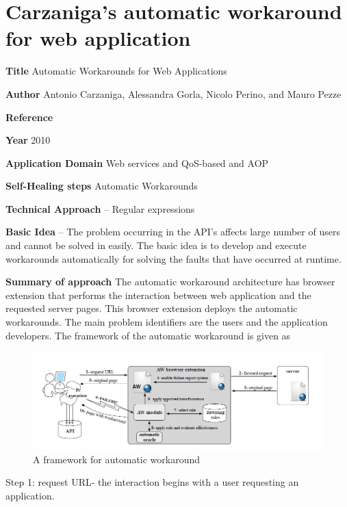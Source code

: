 \section{Carzaniga's automatic workaround for web application}\label{CarzanigaAutomaticWorkaround}
\begin{compactitem}
\item[\textbf{Title}]Automatic Workarounds for Web Applications
\item[\textbf{Author}]Antonio Carzaniga, Alessandra Gorla, Nicolo Perino, and Mauro Pezze\item[\textbf{Reference}] 
\cite{carzaniga_automaticworkaround:_2010}


\item[\textbf{Year}] 2010

\item[\textbf{Application Domain}]Web services and QoS-based and AOP

\item[\textbf{Self-Healing steps}]Automatic Workarounds

\item[\textbf{Technical Approach}]
– Regular expressions

\item[\textbf{Basic Idea}]– The problem occurring in the API’s affects large number of users and cannot be solved in easily. The basic idea is to develop and execute workarounds automatically for solving the faults that have occurred at runtime.

\item[\textbf{Summary of approach}] 
The automatic workaround architecture has browser extension that performs the interaction between
web application and the requested server pages. This browser extension deploys the automatic 
workarounds. The main problem identifiers are the users and the application developers. The framework of the automatic workaround is given as

\begin{figure}[H]
\center
\includegraphics[width=5in]{img/automaticworkaroundframework}
\caption{A framework for automatic workaround}
\end{figure}
Step 1: request URL- the interaction begins with a user requesting an application.


\end{compactitem}
